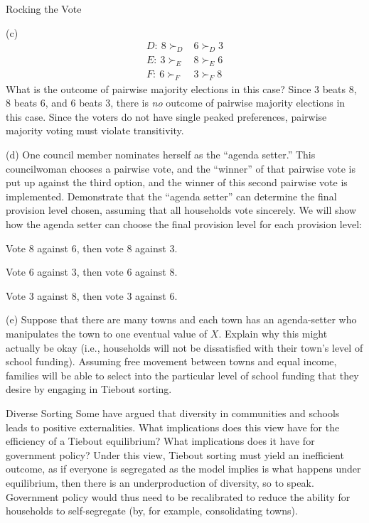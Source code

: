 \documentclass[8pt]{extarticle}
\begin{document}
\begin{problem}{Rocking the Vote}
\begin{problem}{(c)}
      \begin{align*}
        D:~8 \succ_D &6 \succ_D 3\\
        E:~3\succ_E &8 \succ_E 6\\
        F:~6\succ_F &3 \succ_F 8
      \end{align*}
      What is the outcome of pairwise majority elections in this case?
      \tcblower
      Since $3$ beats $8$, $8$ beats $6$, and $6$ beats $3$, there is \textit{no} outcome of pairwise majority elections in this case. Since the voters do not have single peaked preferences, pairwise majority voting must violate transitivity.
    \end{problem}
    \begin{problem}{(d)}
      One council member nominates herself as the ``agenda setter.'' This councilwoman chooses a pairwise vote, and the ``winner'' of that pairwise vote is put up against the third option, and the winner of this second pairwise vote is implemented. Demonstrate that the ``agenda setter'' can determine the final provision level chosen, assuming that all households vote sincerely.
      \tcblower
      We will show how the agenda setter can choose the final provision level for each provision level:
      \begin{description}[font=\normalfont]
        \item[Provision Level 3:] Vote $8$ against $6$, then vote $8$ against $3$.
        \item[Provision Level 8:] Vote $6$ against $3$, then vote $6$ against $8$.
        \item[Provision level 6:] Vote $3$ against $8$, then vote $3$ against $6$.
        \end{description}
    \end{problem}
    \begin{problem}{(e)}
      Suppose that there are many towns and each town has an agenda-setter who manipulates the town to one eventual value of $X$. Explain why this might actually be okay (i.e., households will not be dissatisfied with their town's level of school funding).
      \tcblower
      Assuming free movement between towns and equal income, families will be able to select into the particular level of school funding that they desire by engaging in Tiebout sorting.
    \end{problem}
  \end{problem}
  \begin{problem}{Diverse Sorting}
    Some have argued that diversity in communities and schools leads to positive externalities. What implications does this view have for the efficiency of a Tiebout equilibrium? What implications does it have for government policy?
    \tcblower
    Under this view, Tiebout sorting must yield an inefficient outcome, as if everyone is segregated as the model implies is what happens under equilibrium, then there is an underproduction of diversity, so to speak. Government policy would thus need to be recalibrated to reduce the ability for households to self-segregate (by, for example, consolidating towns).
  \end{problem}
\end{document}
